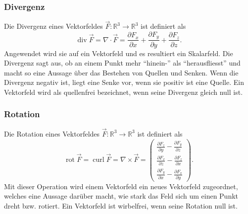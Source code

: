 \subsubsection{Divergenz}
%
Die Divergenz eines Vektorfeldes $\vec{F}:\mathbb{R}^3 \rightarrow \mathbb{R}^3$ ist definiert als 
\[ \operatorname{div}\vec{F} = \nabla\cdot\vec{F} 
= \frac{\partial F_x}{\partial x} + \frac{\partial F_y}{\partial y} + \frac{\partial F_z}{\partial z}. \]
Angewendet wird sie auf ein Vektorfeld und es resultiert ein Skalarfeld.
Die Divergenz sagt aus, ob an einem Punkt mehr ``hinein-'' als ``herausfliesst'' und macht so eine Aussage über das Bestehen von Quellen und Senken. 
Wenn die Divergenz negativ ist, liegt eine Senke vor, wenn sie positiv ist eine Quelle.
Ein Vektorfeld wird als quellenfrei bezeichnet, wenn seine Divergenz gleich null ist.

\subsubsection{Rotation}
%
Die Rotation eines Vektorfeldes $\vec{F}:\mathbb{R}^3 \rightarrow \mathbb{R}^3$ ist definiert als
\[
\renewcommand{\arraystretch}{1.9} 
\operatorname{rot}\vec{F} = 
\operatorname{curl}\vec{F}
=\nabla\times\vec{F}
= \begin{pmatrix}
	\displaystyle
	\frac{\partial F_z}{\partial y} -\frac{\partial F_y}{\partial z}\\
	\displaystyle
	\frac{\partial F_x}{\partial z} -\frac{\partial F_z}{\partial x}\\
	\displaystyle
	\frac{\partial F_y}{\partial x} -\frac{\partial F_x}{\partial y}
\end{pmatrix}
. \]
Mit dieser Operation wird einem Vektorfeld ein neues Vektorfeld zugeordnet, welches eine Aussage darüber macht, wie stark das Feld sich um einen Punkt dreht bzw. rotiert.
Ein Vektorfeld ist wirbelfrei, wenn seine Rotation null ist.
